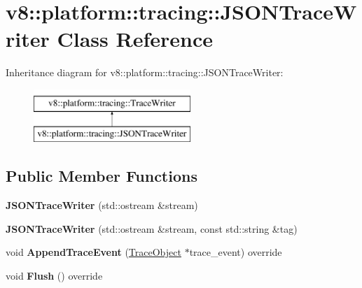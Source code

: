 \hypertarget{classv8_1_1platform_1_1tracing_1_1JSONTraceWriter}{}\section{v8\+:\+:platform\+:\+:tracing\+:\+:J\+S\+O\+N\+Trace\+Writer Class Reference}
\label{classv8_1_1platform_1_1tracing_1_1JSONTraceWriter}
Inheritance diagram for v8\+:\+:platform\+:\+:tracing\+:\+:J\+S\+O\+N\+Trace\+Writer\+:\begin{figure}[H]
\begin{center}
\leavevmode
\includegraphics[height=2.000000cm]{classv8_1_1platform_1_1tracing_1_1JSONTraceWriter}
\end{center}
\end{figure}
\subsection*{Public Member Functions}
\begin{DoxyCompactItemize}
\item 
\mbox{\label{classv8_1_1platform_1_1tracing_1_1JSONTraceWriter_a8daf59435c82dca67d53db1a22c40a48}} 
{\bfseries J\+S\+O\+N\+Trace\+Writer} (std\+::ostream \&stream)
\item 
\mbox{\label{classv8_1_1platform_1_1tracing_1_1JSONTraceWriter_a396076e5e1035b9f379be43a7ca39cfd}} 
{\bfseries J\+S\+O\+N\+Trace\+Writer} (std\+::ostream \&stream, const std\+::string \&tag)
\item 
\mbox{\label{classv8_1_1platform_1_1tracing_1_1JSONTraceWriter_a2684d4b80f4481caad4fe67dc2c71350}} 
void {\bfseries Append\+Trace\+Event} (\mbox{\hyperlink{classv8_1_1platform_1_1tracing_1_1TraceObject}{Trace\+Object}} $\ast$trace\+\_\+event) override
\item 
\mbox{\label{classv8_1_1platform_1_1tracing_1_1JSONTraceWriter_a627ece43e4be04e27ae968d3102d93b0}} 
void {\bfseries Flush} () override
\end{DoxyCompactItemize}
